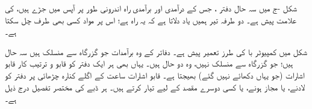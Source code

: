 شکل -ج  میں سہ حال دفتر ، جس کے درآمدی اور برآمدی  راہ  اندرونی طور پر   آپس میں جڑے ہیں، کی علامت  پیش ہے۔ دو طرفہ تیر ہمیں یاد دلاتا ہے کہ یہ راہ ہے؛  اس پر  مواد  کسی بھی  طرف  چل سکتا ہے۔

شکل   میں کمپیوٹر با کی طرز تعمیر پیش ہے۔   دفاتر کے وہ برآمدات جو  گزرگاہ  سے منسلک   ہیں سہ حال ہیں؛ جو  گزرگاہ سے منسلک نہیں، وہ دو حال ہیں۔ یہاں بھی ہر ایک دفتر کو  قابو و ترتیب کار قابو اشارات (جو یہاں دکھائے نہیں گئے)  بھیجتا ہے۔  قابو اشارات ساعت کے   اگلے کنارہ چڑھائی پر دفتر کو لادنے،  یا مجاز  ہونے، یا کسی دوسرے مقصد کے لیے تیار کرتے ہیں۔ ہر ڈبے کی مختصر تفصیل درج ذیل ہے۔

\begin{figure}
\centering
{}
\end{figure}
